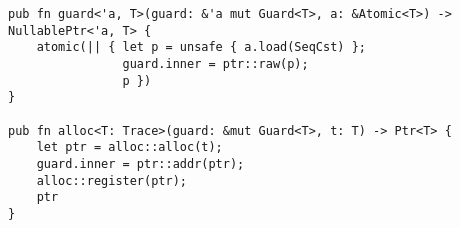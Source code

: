 \begin{lstlisting}[caption=Commonly used operations defined by CMR.]
pub fn guard<'a, T>(guard: &'a mut Guard<T>, a: &Atomic<T>) -> NullablePtr<'a, T> {
    atomic(|| { let p = unsafe { a.load(SeqCst) };
                guard.inner = ptr::raw(p);
                p })
}

pub fn alloc<T: Trace>(guard: &mut Guard<T>, t: T) -> Ptr<T> {
    let ptr = alloc::alloc(t);
    guard.inner = ptr::addr(ptr);
    alloc::register(ptr);
    ptr
}\end{lstlisting}
